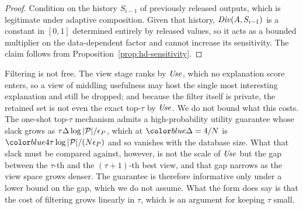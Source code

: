 \begin{proof}
Condition on the history $S_{i-1}$ of previously released outputs, which is legitimate under adaptive composition.
Given that history, $\mathit{Div}(A,S_{i-1})$ is a constant in $[0,1]$ determined entirely by released values, so it acts as a bounded multiplier on the data-dependent factor and cannot increase its sensitivity.
The claim follows from Proposition~\ref{prop:hd-sensitivity}.
\end{proof}

Filtering is not free.
The view stage ranks by $\mathit{Use}$, which no explanation score enters, so a view of middling usefulness may host the single most interesting explanation and still be dropped; and because the filter itself is private, the retained set is not even the exact top-$\tau$ by $\mathit{Use}$.
We do not bound what this costs.
The one-shot top-$\tau$ mechanism admits a high-probability utility guarantee whose slack grows as $\tau\Delta\log|\mathcal{P}|/\epsilon_P$, which at $\added{\Delta=4/N}$ is $\added{4\tau\log|\views|/(N\epsilon_P)}$ and so vanishes with the database size.
What that slack must be compared against, however, is not the scale of $\mathit{Use}$ but the gap between the $\tau$-th and the $(\tau{+}1)$-th best view, and that gap narrows as the view space grows denser.
The guarantee is therefore informative only under a lower bound on the gap, which we do not assume.
What the form does say is that the cost of filtering grows linearly in $\tau$, which is an argument for keeping $\tau$ small.


